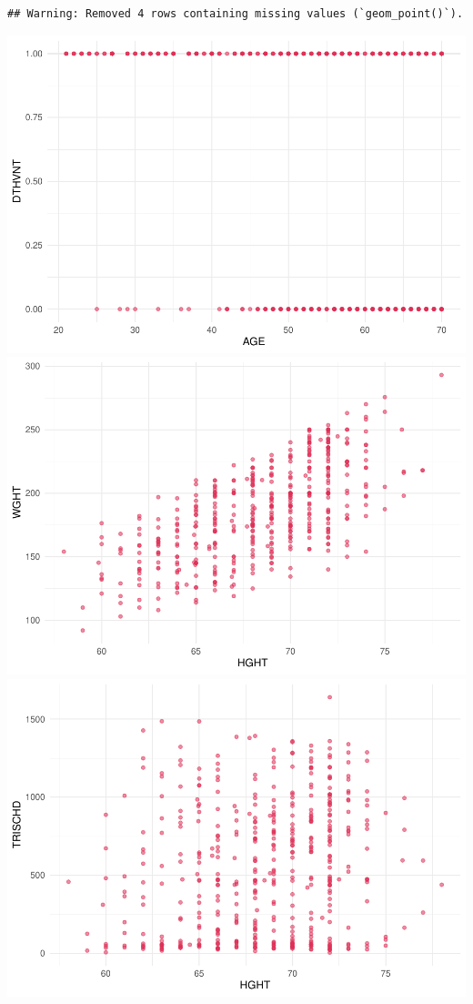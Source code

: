\documentclass[
]{article}
\begin{document}
\begin{verbatim}
## Warning: Removed 4 rows containing missing values (`geom_point()`).
\end{verbatim}

\includegraphics{Q1_markdown_files/figure-latex/unnamed-chunk-7-4.pdf}
\includegraphics{Q1_markdown_files/figure-latex/unnamed-chunk-7-5.pdf}
\includegraphics{Q1_markdown_files/figure-latex/unnamed-chunk-7-6.pdf}
\end{document}

